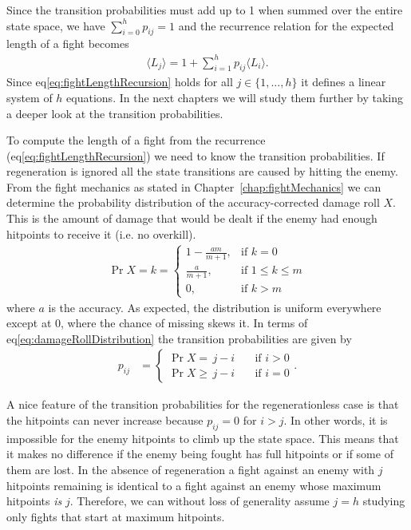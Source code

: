 Since the transition probabilities must add up to 1 when summed over the entire state space, we have $\sum_{i=0}^{h}p_{ij} = 1$ and the recurrence relation for the expected length of a fight becomes
\begin{align}
	\langle L_j \rangle
		= 1 + \sum_{i=1}^h p_{ij}\langle L_i \rangle.
	\label{eq:fightLengthRecursion}
\end{align}
Since eq\ref{eq:fightLengthRecursion} holds for all $j \in \{1,\ldots,h\}$ it defines a linear system of $h$ equations. In the next chapters we will study them further by taking a deeper look at the transition probabilities.

To compute the length of a fight from the recurrence (eq\ref{eq:fightLengthRecursion}) we need to know the transition probabilities. If regeneration is ignored all the state transitions are caused by hitting the enemy. From the fight mechanics as stated in Chapter~\ref{chap:fightMechanics} we can determine the probability distribution of the accuracy-corrected damage roll $X$. This is the amount of damage that would be dealt if the enemy had enough hitpoints to receive it (i.e. no overkill).
\begin{align}
	\Pr{X = k} =
	\begin{cases}
		1 - \frac{am}{m+1}, &\mbox{if } k = 0 \\
		\frac{a}{m+1},      &\mbox{if }1 \leq k \leq m\\
		0,      			&\mbox{if }k > m
	\end{cases}\label{eq:damageRollDistribution}
\end{align}
where $a$ is the accuracy. As expected, the distribution is uniform everywhere except at 0, where the chance of missing skews it. In terms of eq\ref{eq:damageRollDistribution} the transition probabilities are given by
\begin{align}
    p_{ij}
         &= \begin{cases}
            \Pr{X=\,j-i} \quad &\mbox{if } i > 0 \\
            \Pr{X\geq\,j-i} \quad &\mbox{if } i = 0
        \end{cases}\label{eq:noregenProb}.
\end{align}

A nice feature of the transition probabilities for the regenerationless case is that the hitpoints can never increase because $p_{ij} = 0$ for $i > j$. In other words, it is impossible for the enemy hitpoints to climb up the state space. This means that it makes no difference if the enemy being fought has full hitpoints or if some of them are lost. In the absence of regeneration a fight against an enemy with $j$ hitpoints remaining is identical to a fight against an enemy whose maximum hitpoints \emph{is} $j$. Therefore, we can without loss of generality assume $j=h$ studying only fights that start at maximum hitpoints.

